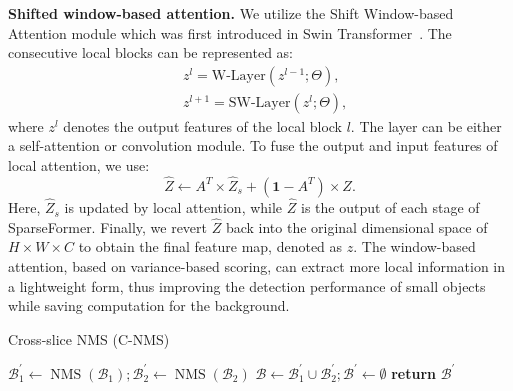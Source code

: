 \vspace{2mm}\noindent\textbf{Shifted window-based attention.}
We utilize the Shift Window-based Attention module which was first introduced in Swin Transformer~\cite{liu2021swin}. The consecutive local blocks can be represented as:
\begin{equation}
\begin{split}
    & z^{l} = \text{W-Layer}(z^{l-1}; \Theta), \\
    & z^{l+1} = \text{SW-Layer}(z^{l}; \Theta),
\end{split}
\end{equation}
where $z^l$ denotes the output features of the local block $l$. The layer can be either a self-attention or convolution module.
%
To fuse the output and input features of local attention, we use:
\begin{equation}
\hat{Z} \gets A^T\times \hat{Z}_s + (\mathbf{1} -A^T) \times Z.
\end{equation}
Here, $\hat{Z}_s$ is updated by local attention, while $\hat{Z}$ is the output of each stage of SparseFormer. Finally, we revert $\hat{Z}$ back into the original dimensional space of $H\times W\times C$ to obtain the final feature map, denoted as $z$.  The window-based attention, based on variance-based scoring, can extract more local information in a lightweight form, thus improving the detection performance of small objects while saving computation for the background.

\setlength{\textfloatsep}{5pt}
\begin{algorithm}[t]
\caption {Cross-slice NMS (C-NMS)}
\label{alg:nmbs}
$\mathcal{B}_{1}^{\prime} \gets \mathop{\mathrm{NMS}}(\mathcal{B}_{1}); \mathcal{B}_{2}^{\prime} \gets \mathop{\mathrm{NMS}}(\mathcal{B}_{2})$\;
$\mathcal{B} \gets \mathcal{B}_{1}^{\prime} \cup \mathcal{B}_{2}^{\prime}; \mathcal{B}^{\prime} \gets \emptyset$\;
\textbf{return} $\mathcal{B}^{\prime}$\;
\end{algorithm}


